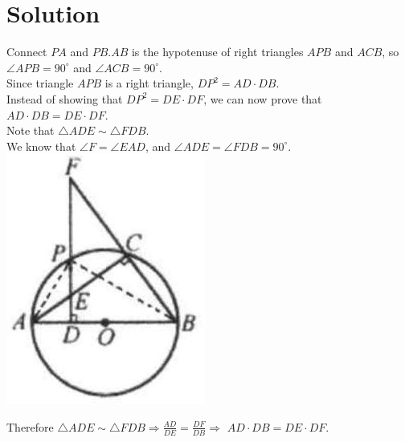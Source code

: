 \documentclass{article}
\begin{document}
\section*{Solution}
Connect \(P A\) and \(P B . A B\) is the hypotenuse of right triangles \(A P B\) and \(A C B\), so \(\angle A P B=90^{\circ}\) and \(\angle A C B=90^{\circ}\).\\
Since triangle \(A P B\) is a right triangle, \(D P^{2}=A D \cdot D B\).\\
Instead of showing that \(D P^{2}=D E \cdot D F\), we can now prove that \(A D \cdot D B=D E \cdot D F\).\\
Note that \(\triangle A D E \sim \triangle F D B\).\\
We know that \(\angle F=\angle E A D\), and \(\angle A D E=\angle F D B=90^{\circ}\).\\
\centering
\includegraphics[width=\textwidth]{images/173(1).jpg}

Therefore \(\triangle A D E \sim \triangle F D B \Rightarrow \frac{A D}{D E}=\frac{D F}{D B} \Rightarrow\) \(A D \cdot D B=D E \cdot D F\).
\end{document}
